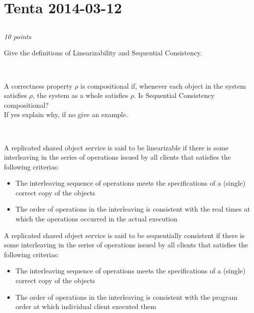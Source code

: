 \documentclass[a4paper]{article}
\newcommand{\points}[1]{\subsection{} \textit{#1 points}\\}
\newcommand{\question}[2][]{
  \parbox[t]{\textwidth}{
    \ifthenelse{\equal{#1}{}}{}{#1)}
    \parbox[t]{0.95\textwidth}{#2}}\\}
\newcommand{\solution}[2][]{
  \ifthenelse{\equal{#1}{} \or \equal{#1}{a}}{\\[3pt]\textit{Solution: }\\[0.1cm]}{}
  \question[#1]{#2}
}
\newcommand{\highlight}[1]{{\color{blue}#1}}
\begin{document}
\section{Tenta 2014-03-12}
\points{10}
\label{2014-03:linearizability}
\question[a]{
  Give the definitions of Linearizability and Sequential Consistency.
}
\question[b]{
  A correctness property $\rho$ is compositional if, whenever
  each object in the system satisfies $\rho$, the system as a whole
  satisfies $\rho$. Is Sequential Consistency compositional? \\
  If yes explain why, if no give an example.
}
\solution[a]{
  A replicated shared object service is said to be
  \highlight{linearizable} if there is some interleaving in the series
  of operations issued by all clients that satisfies the following
  criterias:
  \begin{itemize}
    \item{The interleaving sequence of operations meets the
        specifications of a (single) correct copy of the objects}
    \item{The order of operations in the interleaving is consistent
        with the \highlight{real times at which the operations occurred
          in the actual execution}}
  \end{itemize}

  A replicated shared object service is said to be
  \highlight{sequentially consistent} if there is some interleaving in
  the series of operations issued by all clients that satisfies the
  following criterias:
  \begin{itemize}
    \item{The interleaving sequence of operations meets the
        specifications of a (single) correct copy of the objects}
  \item{The order of operations in the interleaving is consistent with
      the \highlight{program order at which individual client executed
        them}}
  \end{itemize}
}
\end{document}
